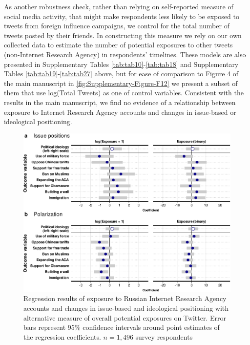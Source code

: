 \documentclass[
  12pt,
]{article}
\begin{document}
As another robustness check, rather than relying on self-reported measure of social media activity, that might make respondents less likely to be exposed to tweets from foreign influence campaigns, we control for the total number of tweets posted by their friends. In constructing this measure we rely on our own collected data to estimate the number of potential exposures to other tweets (non-Internet Research Agency) in respondents' timelines. These models are also presented in Supplementary Tables \ref{tab:tab10}-\ref{tab:tab18} and Supplementary Tables \ref{tab:tab19}-\ref{tab:tab27} above, but for ease of comparison to Figure 4 of the main manuscript in \autoref{fig:Supplementary-Figure-F12} we present a subset of them that use log(Total Tweets) as one of control variables. Consistent with the results in the main manuscript, we find no evidence of a relationship between exposure to Internet Research Agency accounts and changes in issue-based or ideological positioning.

\begin{figure}
\centering
\includegraphics{Supplementary_Information_files/figure-latex/Supplementary-Figure-F12-1.pdf}
\caption{\label{fig:Supplementary-Figure-F12}Regression results of exposure to Russian Internet Research Agency accounts and changes in issue-based and ideological positioning with alternative measure of overall potential exposures on Twitter. Error bars represent 95\% confidence intervals around point estimates of the regression coefficients. \(n = 1,496\) survey respondents}
\end{figure}
\end{document}
